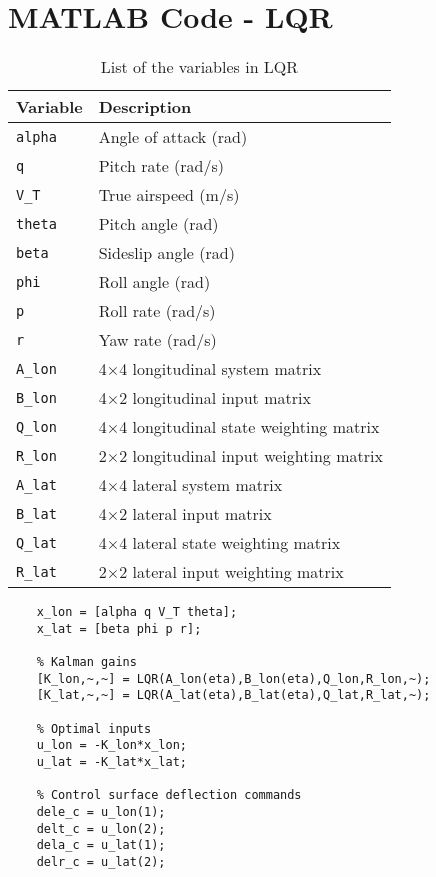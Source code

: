 \documentclass[a4paper, 12pt]{report}
\begin{document}
\appendix

\chapter{MATLAB Code - LQR}

\begin{table}[h]
	\centering
	\begin{tabular}{ll}
		\toprule
		\textbf{Variable} & \textbf{Description} \\
		\midrule
		\verb+alpha+ & Angle of attack (rad)\\
		\verb+q+ & Pitch rate (rad/s) \\
		\verb+V_T+ & True airspeed (m/s) \\
		\verb+theta+ & Pitch angle (rad) \\
		\verb+beta+ & Sideslip angle (rad) \\
		\verb+phi+ & Roll angle (rad) \\
		\verb+p+ & Roll rate (rad/s) \\
		\verb+r+ & Yaw rate (rad/s) \\
		\verb+A_lon+ & 4$\times$4 longitudinal system matrix \\
		\verb+B_lon+ & 4$\times$2 longitudinal input matrix \\
		\verb+Q_lon+ & 4$\times$4 longitudinal state weighting matrix \\
		\verb+R_lon+ & 2$\times$2 longitudinal input weighting matrix \\
		\verb+A_lat+ & 4$\times$4 lateral system matrix \\
		\verb+B_lat+ & 4$\times$2 lateral input matrix \\
		\verb+Q_lat+ & 4$\times$4 lateral state weighting matrix \\
		\verb+R_lat+ & 2$\times$2 lateral input weighting matrix \\
		\bottomrule
	\end{tabular}
	\caption{List of the variables in LQR}
	\label{tab:lqr_variables}
\end{table}

\pagebreak

\begin{lstlisting}[style=matlabFrameTB, gobble=4]
	% States
	x_lon = [alpha q V_T theta];
	x_lat = [beta phi p r];
	
	% Kalman gains
	[K_lon,~,~] = LQR(A_lon(eta),B_lon(eta),Q_lon,R_lon,~);
	[K_lat,~,~] = LQR(A_lat(eta),B_lat(eta),Q_lat,R_lat,~);
		
	% Optimal inputs
	u_lon = -K_lon*x_lon;
	u_lat = -K_lat*x_lat;
	
	% Control surface deflection commands
	dele_c = u_lon(1);
	delt_c = u_lon(2);
	dela_c = u_lat(1);
	delr_c = u_lat(2);
\end{lstlisting}
\end{document}
